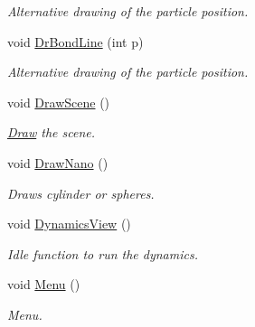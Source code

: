 \begin{DoxyCompactItemize}
\begin{DoxyCompactList}\small\item\em \-Alternative drawing of the particle position. \end{DoxyCompactList}\item 
\hypertarget{classForces_aaafad604e85636fc1404b8973e3a6361}{void \hyperlink{classForces_aaafad604e85636fc1404b8973e3a6361}{\-Dr\-Bond\-Line} (int p)}\label{classForces_aaafad604e85636fc1404b8973e3a6361}

\begin{DoxyCompactList}\small\item\em \-Alternative drawing of the particle position. \end{DoxyCompactList}\item 
\hypertarget{classForces_ad3af99165d3fa882579d67cea83e9eab}{void \hyperlink{classForces_ad3af99165d3fa882579d67cea83e9eab}{\-Draw\-Scene} ()}\label{classForces_ad3af99165d3fa882579d67cea83e9eab}

\begin{DoxyCompactList}\small\item\em \hyperlink{classDraw}{\-Draw} the scene. \end{DoxyCompactList}\item 
\hypertarget{classForces_a7fa19bc7fff5918e9ef3ad1e80d41930}{void \hyperlink{classForces_a7fa19bc7fff5918e9ef3ad1e80d41930}{\-Draw\-Nano} ()}\label{classForces_a7fa19bc7fff5918e9ef3ad1e80d41930}

\begin{DoxyCompactList}\small\item\em \-Draws cylinder or spheres. \end{DoxyCompactList}\item 
\hypertarget{classForces_aceab61c4b3e708dc33860c1c2cf2e407}{void \hyperlink{classForces_aceab61c4b3e708dc33860c1c2cf2e407}{\-Dynamics\-View} ()}\label{classForces_aceab61c4b3e708dc33860c1c2cf2e407}

\begin{DoxyCompactList}\small\item\em \-Idle function to run the dynamics. \end{DoxyCompactList}\item 
\hypertarget{classForces_afdf1ca9e7afc3e7ec41b47fea4b3d80d}{void \hyperlink{classForces_afdf1ca9e7afc3e7ec41b47fea4b3d80d}{\-Menu} ()}\label{classForces_afdf1ca9e7afc3e7ec41b47fea4b3d80d}

\begin{DoxyCompactList}\small\item\em \-Menu. \end{DoxyCompactList}\end{DoxyCompactItemize}
